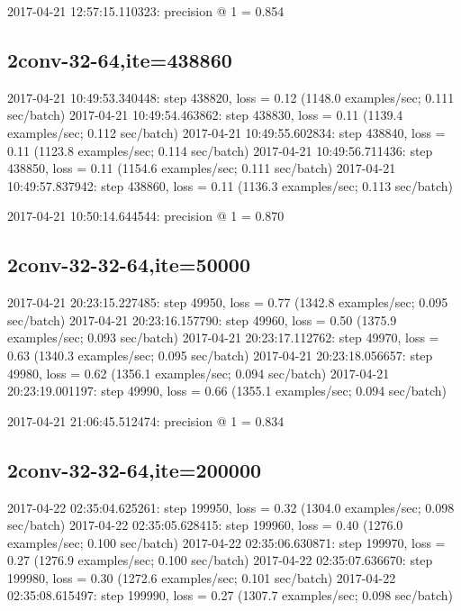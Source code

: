 \documentclass[a4paper, UTF8]{ctexrep}
\begin{document}
            2017-04-21 12:57:15.110323: precision @ 1 = 0.854

          \subsection{2conv-32-64,ite=438860}
            2017-04-21 10:49:53.340448: step 438820, loss = 0.12 (1148.0 examples/sec; 0.111 sec/batch)
            2017-04-21 10:49:54.463862: step 438830, loss = 0.11 (1139.4 examples/sec; 0.112 sec/batch)
            2017-04-21 10:49:55.602834: step 438840, loss = 0.11 (1123.8 examples/sec; 0.114 sec/batch)
            2017-04-21 10:49:56.711436: step 438850, loss = 0.11 (1154.6 examples/sec; 0.111 sec/batch)
            2017-04-21 10:49:57.837942: step 438860, loss = 0.11 (1136.3 examples/sec; 0.113 sec/batch)

            2017-04-21 10:50:14.644544: precision @ 1 = 0.870 

          \subsection{2conv-32-32-64,ite=50000}
            2017-04-21 20:23:15.227485: step 49950, loss = 0.77 (1342.8 examples/sec; 0.095 sec/batch)
            2017-04-21 20:23:16.157790: step 49960, loss = 0.50 (1375.9 examples/sec; 0.093 sec/batch)
            2017-04-21 20:23:17.112762: step 49970, loss = 0.63 (1340.3 examples/sec; 0.095 sec/batch)
            2017-04-21 20:23:18.056657: step 49980, loss = 0.62 (1356.1 examples/sec; 0.094 sec/batch)
            2017-04-21 20:23:19.001197: step 49990, loss = 0.66 (1355.1 examples/sec; 0.094 sec/batch)

            2017-04-21 21:06:45.512474: precision @ 1 = 0.834

          \subsection{2conv-32-32-64,ite=200000}
            2017-04-22 02:35:04.625261: step 199950, loss = 0.32 (1304.0 examples/sec; 0.098 sec/batch)
            2017-04-22 02:35:05.628415: step 199960, loss = 0.40 (1276.0 examples/sec; 0.100 sec/batch)
            2017-04-22 02:35:06.630871: step 199970, loss = 0.27 (1276.9 examples/sec; 0.100 sec/batch)
            2017-04-22 02:35:07.636670: step 199980, loss = 0.30 (1272.6 examples/sec; 0.101 sec/batch)
            2017-04-22 02:35:08.615497: step 199990, loss = 0.27 (1307.7 examples/sec; 0.098 sec/batch)
\end{document}
